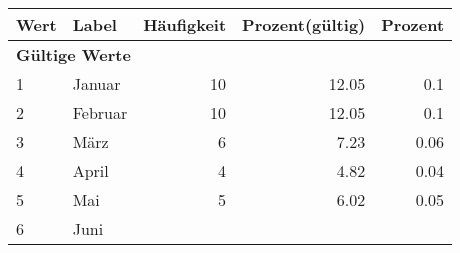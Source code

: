      \begin{longtable}{lXrrr}
     \toprule
     \textbf{Wert} & \textbf{Label} & \textbf{Häufigkeit} & \textbf{Prozent(gültig)} & \textbf{Prozent} \\
     \endhead
     \midrule
     \multicolumn{5}{l}{\textbf{Gültige Werte}}\\

     1 &
     \multicolumn{1}{X}{ Januar   } &


       \num{10} &
       \num[round-mode=places,round-precision=2]{12,05} &
         \num[round-mode=places,round-precision=2]{0,1} \\

     2 &
     \multicolumn{1}{X}{ Februar   } &


       \num{10} &
       \num[round-mode=places,round-precision=2]{12,05} &
         \num[round-mode=places,round-precision=2]{0,1} \\

     3 &
     \multicolumn{1}{X}{ März   } &


       \num{6} &
       \num[round-mode=places,round-precision=2]{7,23} &
         \num[round-mode=places,round-precision=2]{0,06} \\

     4 &
     \multicolumn{1}{X}{ April   } &


       \num{4} &
       \num[round-mode=places,round-precision=2]{4,82} &
         \num[round-mode=places,round-precision=2]{0,04} \\

     5 &
     \multicolumn{1}{X}{ Mai   } &


       \num{5} &
       \num[round-mode=places,round-precision=2]{6,02} &
         \num[round-mode=places,round-precision=2]{0,05} \\

     6 &
     \multicolumn{1}{X}{ Juni   } &



\end{longtable}
